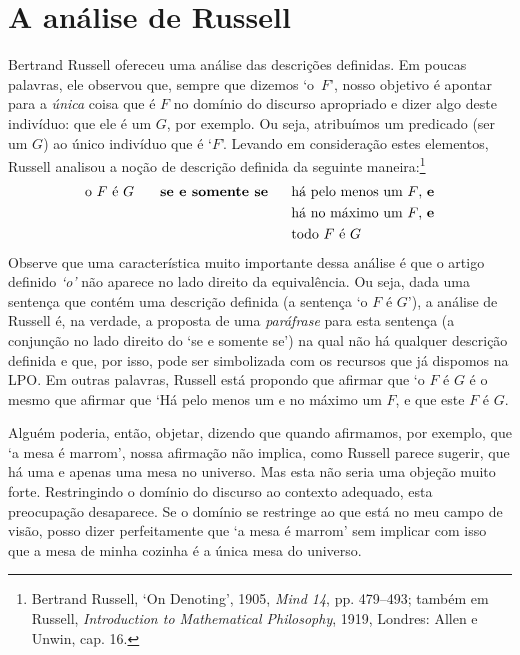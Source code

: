 \section{A análise de Russell}
Bertrand Russell ofereceu uma análise das descrições definidas.
Em poucas palavras, ele observou que, sempre que dizemos \mbox{`o $F$'}, nosso objetivo é apontar para a \emph{única} coisa que é $F$ no domínio do discurso apropriado e dizer algo deste indivíduo: que ele é um $G$, por exemplo.
Ou seja, atribuímos um predicado (ser um $G$) ao único indivíduo que é `$F$'.
Levando em consideração estes elementos, Russell analisou a noção de descrição definida da seguinte maneira:\footnote{
	Bertrand Russell, `On Denoting', 1905, \emph{Mind 14}, pp. 479--493; também em Russell, \emph{Introduction to Mathematical Philosophy}, 1919, Londres: Allen e Unwin, cap. 16.}
	\begin{align*}
		\text{o $F$ é $G$  \textbf{ \ \ \ se e somente se} }&\text{ \ \ \ há pelo menos um $F$, \textbf{e}}\\
	&\text{ \ \ \ há no máximo um $F$, \textbf{e}}\\	
	&\text{ \ \ \ todo $F$ é $G$}
\end{align*}
Observe que uma característica muito importante dessa análise é que o artigo definido \emph{`o'} não aparece no lado direito da equivalência.
Ou seja, dada uma sentença que contém uma descrição definida (a sentença `o $F$ é $G$'), a análise de Russell é, na verdade, a proposta de uma \emph{paráfrase} para esta sentença (a conjunção no lado direito do `se e somente se') na qual não há qualquer descrição definida e que, por isso,  pode ser simbolizada com os recursos que já dispomos na LPO.
Em outras palavras, Russell está propondo que afirmar que `o $F$ é $G$ é o mesmo que afirmar que `Há pelo menos um e no máximo um $F$, e que este $F$ é  $G$.

Alguém poderia, então, objetar, dizendo que quando afirmamos, por exemplo, que `a mesa é marrom', nossa afirmação não implica, como Russell parece sugerir, que há uma e apenas uma mesa no universo.
Mas esta não seria uma objeção muito forte.
Restringindo o domínio do discurso ao contexto adequado, esta preocupação desaparece. Se o domínio se restringe ao que está no meu campo de visão, posso dizer perfeitamente que `a mesa é marrom' sem implicar com isso que a mesa de minha cozinha é a única mesa do universo.

